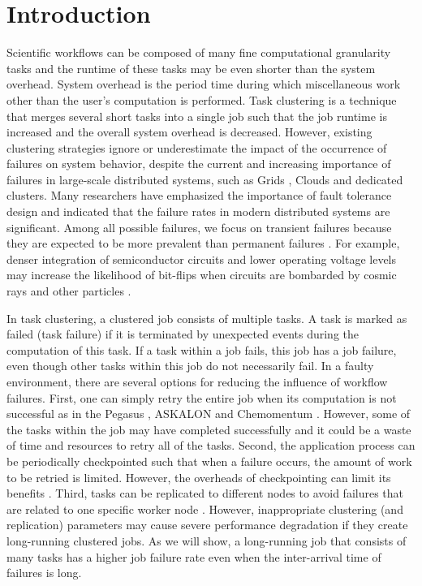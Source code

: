 \documentclass{IOS-Book-Article}
\begin{document}
\thispagestyle{empty}
\pagestyle{empty}

\section*{Introduction}


Scientific workflows can be composed of many fine computational granularity tasks and the runtime of these tasks may be even shorter than the system overhead. System overhead is the period time during which miscellaneous work other than the user’s computation is performed. Task clustering \cite{Chen2013a, Singh2008, Chen2012, Maheshwari2012, Ferreira-granularity-2013, Integration2012} is a technique that merges several short tasks into a single job such that the job runtime is increased and the overall system overhead is decreased. However, existing clustering strategies ignore or underestimate the impact of the occurrence of failures on system behavior, despite the current and increasing importance of failures in large-scale distributed systems, such as Grids \cite{Bresnahan2011, Deelman2004, Rubing2005}, Clouds \cite{Deelman2008, Berriman2010, Bresnahan2011} and dedicated clusters. Many researchers \cite{Zhang2004, Tang1990, Schroeder2006, Sahoo2004} have emphasized the importance of fault tolerance design and indicated that the failure rates in modern distributed systems are significant. Among all possible failures, we focus on transient failures because they are expected to be more prevalent than permanent failures \cite{Zhang2004}. For example, denser integration of semiconductor circuits and lower operating voltage levels may increase the likelihood of bit-flips when circuits are bombarded by cosmic rays and other particles \cite{Zhang2004}. 

In task clustering, a clustered job consists of multiple tasks. A task is marked as failed (task failure) if it is terminated by unexpected events during the computation of this task. If a task within a job fails, this job has a job failure, even though other tasks within this job do not necessarily fail. 
In a faulty environment, there are several options for reducing the influence of workflow failures. First, one can simply retry the entire job when its computation is not successful as in the Pegasus \cite{Deelman2004}, ASKALON \cite{fahringer2007askalon} and Chemomentum \cite{schuller2008chemomentum}. However, some of the tasks within the job may have completed successfully and it could be a waste of time and resources to retry all of the tasks. Second, the application process can be periodically checkpointed such that when a failure occurs, the amount of work to be retried is limited. However, the overheads of checkpointing can limit its benefits \cite{Zhang2004}. Third, tasks can be replicated to different nodes to avoid failures that are related to one specific worker node \cite{Plankensteiner2009}. However, inappropriate clustering (and replication) parameters may cause severe performance degradation if they create long-running clustered jobs. As we will show, a long-running job that consists of many tasks has a higher job failure rate even when the inter-arrival time of failures is long. 
\end{document}
